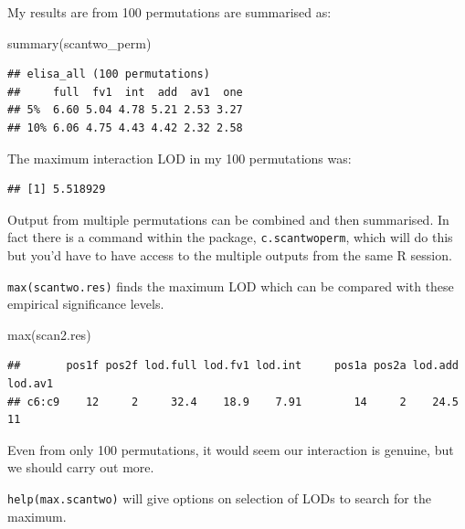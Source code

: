 \documentclass[
]{book}
\newenvironment{Shaded}{\begin{snugshade}}{\end{snugshade}}
\newcommand{\FunctionTok}[1]{\textcolor[rgb]{0.00,0.00,0.00}{#1}}
\newcommand{\NormalTok}[1]{#1}
\newcommand{\SpecialCharTok}[1]{\textcolor[rgb]{0.00,0.00,0.00}{#1}}
\begin{document}
My results are from 100 permutations are summarised as:

\begin{Shaded}
\begin{Highlighting}[]
\FunctionTok{summary}\NormalTok{(scantwo\_perm)}
\end{Highlighting}
\end{Shaded}

\begin{verbatim}
## elisa_all (100 permutations)
##     full  fv1  int  add  av1  one
## 5%  6.60 5.04 4.78 5.21 2.53 3.27
## 10% 6.06 4.75 4.43 4.42 2.32 2.58
\end{verbatim}

The maximum interaction LOD in my 100 permutations was:

\begin{Shaded}
\end{Shaded}

\begin{verbatim}
## [1] 5.518929
\end{verbatim}

Output from multiple permutations can be combined and then summarised. In fact there is a command within the package, \texttt{c.scantwoperm}, which will do this but you'd have to have access to the multiple outputs from the same R session.

\texttt{max(scantwo.res)} finds the maximum LOD which can be compared with these empirical significance levels.

\begin{Shaded}
\begin{Highlighting}[]
\FunctionTok{max}\NormalTok{(scan2.res)}
\end{Highlighting}
\end{Shaded}

\begin{verbatim}
##       pos1f pos2f lod.full lod.fv1 lod.int     pos1a pos2a lod.add lod.av1
## c6:c9    12     2     32.4    18.9    7.91        14     2    24.5      11
\end{verbatim}

Even from only 100 permutations, it would seem our interaction is genuine, but we should carry out more.

\texttt{help(max.scantwo)} will give options on selection of LODs to search for the maximum.
\end{document}
